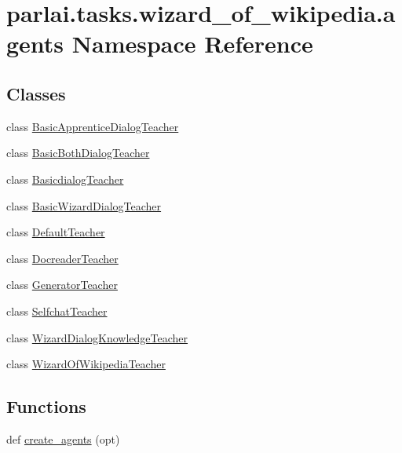 \hypertarget{namespaceparlai_1_1tasks_1_1wizard__of__wikipedia_1_1agents}{}\section{parlai.\+tasks.\+wizard\+\_\+of\+\_\+wikipedia.\+agents Namespace Reference}
\label{namespaceparlai_1_1tasks_1_1wizard__of__wikipedia_1_1agents}
\subsection*{Classes}
\begin{DoxyCompactItemize}
\item 
class \hyperlink{classparlai_1_1tasks_1_1wizard__of__wikipedia_1_1agents_1_1BasicApprenticeDialogTeacher}{Basic\+Apprentice\+Dialog\+Teacher}
\item 
class \hyperlink{classparlai_1_1tasks_1_1wizard__of__wikipedia_1_1agents_1_1BasicBothDialogTeacher}{Basic\+Both\+Dialog\+Teacher}
\item 
class \hyperlink{classparlai_1_1tasks_1_1wizard__of__wikipedia_1_1agents_1_1BasicdialogTeacher}{Basicdialog\+Teacher}
\item 
class \hyperlink{classparlai_1_1tasks_1_1wizard__of__wikipedia_1_1agents_1_1BasicWizardDialogTeacher}{Basic\+Wizard\+Dialog\+Teacher}
\item 
class \hyperlink{classparlai_1_1tasks_1_1wizard__of__wikipedia_1_1agents_1_1DefaultTeacher}{Default\+Teacher}
\item 
class \hyperlink{classparlai_1_1tasks_1_1wizard__of__wikipedia_1_1agents_1_1DocreaderTeacher}{Docreader\+Teacher}
\item 
class \hyperlink{classparlai_1_1tasks_1_1wizard__of__wikipedia_1_1agents_1_1GeneratorTeacher}{Generator\+Teacher}
\item 
class \hyperlink{classparlai_1_1tasks_1_1wizard__of__wikipedia_1_1agents_1_1SelfchatTeacher}{Selfchat\+Teacher}
\item 
class \hyperlink{classparlai_1_1tasks_1_1wizard__of__wikipedia_1_1agents_1_1WizardDialogKnowledgeTeacher}{Wizard\+Dialog\+Knowledge\+Teacher}
\item 
class \hyperlink{classparlai_1_1tasks_1_1wizard__of__wikipedia_1_1agents_1_1WizardOfWikipediaTeacher}{Wizard\+Of\+Wikipedia\+Teacher}
\end{DoxyCompactItemize}
\subsection*{Functions}
\begin{DoxyCompactItemize}
\item 
def \hyperlink{namespaceparlai_1_1tasks_1_1wizard__of__wikipedia_1_1agents_a3fb02e79313f0dbce37b5120cc9add1c}{create\+\_\+agents} (opt)
\end{DoxyCompactItemize}
